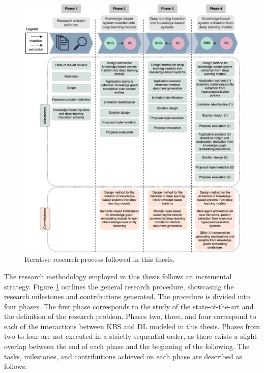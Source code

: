 \begin{figure}
    \centering
    \includegraphics[width=\linewidth]{3_objectives/figures/research_methodology.eps}
    \caption{Iterative research process followed in this thesis.}
    \label{fig:research_method}
\end{figure}

The research methodology employed in this thesis follows an incremental strategy. Figure \ref{fig:research_method} outlines the general research procedure, showcasing the research milestones and contributions generated. The procedure is divided into four phases. The first phase corresponds to the study of the state-of-the-art and the definition of the research problem. Phases two, three, and four correspond to each of the interactions between KBS and DL modeled in this thesis. Phases from two to four are not executed in a strictly sequential order, as there exists a slight overlap between the end of each phase and the beginning of the following. The tasks, milestones, and contributions achieved on each phase are described as follows:
  
